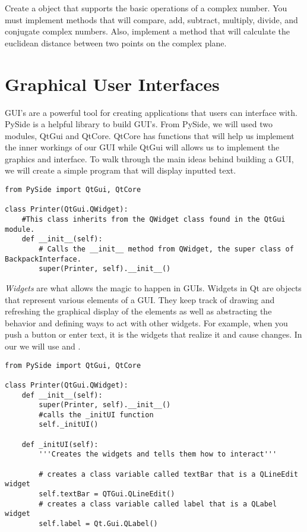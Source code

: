 \begin{problem}
Create a  object that supports the basic operations of a complex number.
You must implement methods that will compare, add, subtract, multiply, divide, and conjugate complex numbers.
Also, implement a  method that will calculate the euclidean distance between two points on the complex plane.
\label{prob:complexNum}
\end{problem}

\section*{Graphical User Interfaces}

GUI's are a powerful tool for creating applications that users can interface with.
PySide is a helpful library to build GUI's.
From PySide, we will used two modules, QtGui and QtCore.
QtCore has functions that will help us implement the inner workings of our GUI while QtGui will allows us to implement the graphics and interface. 
To walk through the main ideas behind building a GUI, we will create a simple program that will display inputted text.

\begin{lstlisting}
from PySide import QtGui, QtCore

class Printer(QtGui.QWidget): 
	#This class inherits from the QWidget class found in the QtGui module.
	def __init__(self):
		# Calls the __init__ method from QWidget, the super class of BackpackInterface.
		super(Printer, self).__init__() 

\end{lstlisting}

\emph{Widgets} are what allows the magic to happen in GUIs.
Widgets in Qt are objects that represent various elements of a GUI.
They keep track of drawing and refreshing the graphical display of the elements as well as abstracting the behavior and defining ways to act with other widgets.
For example, when you push a button or enter text, it is the widgets that realize it and cause changes.
In our  we will use  and .

\begin{lstlisting}
from PySide import QtGui, QtCore

class Printer(QtGui.QWidget):
	def __init__(self):
		super(Printer, self).__init__() 
		#calls the _initUI function
		self._initUI()
	
	def _initUI(self): 
		'''Creates the widgets and tells them how to interact'''
		
		# creates a class variable called textBar that is a QLineEdit widget 
		self.textBar = QTGui.QLineEdit()
		# creates a class variable called label that is a QLabel widget
		self.label = Qt.Gui.QLabel()

\end{lstlisting}

